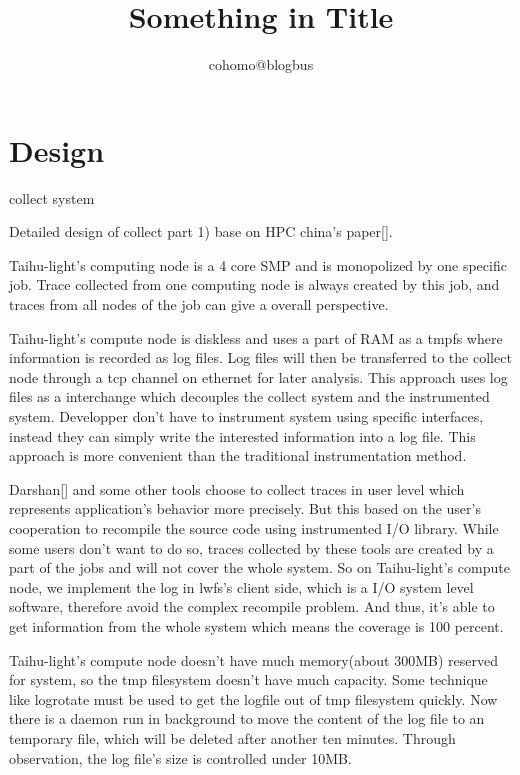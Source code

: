 \documentclass{article}
\begin{document}
\title{Something in Title}

\author{cohomo@blogbus}

\date{}

\maketitle

\fi

\section{Design}

\label{sec:design}

collect system

Detailed design of collect part 1)
base on HPC china's paper[].

Taihu-light's computing node is a 4 core SMP and is monopolized by one specific job. Trace collected from one computing node is always created by this job, and traces from all nodes of the job can give a overall perspective.

Taihu-light's compute node is diskless and uses a part of RAM as a tmpfs where information is recorded as log files. Log files will then be transferred to the collect node through a tcp channel on ethernet for later analysis. This approach uses log files as a interchange which decouples the collect system and the instrumented system. Developper don't have to instrument system using specific interfaces, instead they can simply write the interested information into a log file. This approach is more convenient than the traditional instrumentation method.

Darshan[] and some other tools choose to collect traces in user level which represents application's behavior more precisely. But this based on the user's cooperation to recompile the source code using instrumented I/O library. While some users don't want to do so, traces collected by these tools are created by a part of the jobs and will not cover the whole system. So on Taihu-light's compute node, we implement the log in lwfs's client side, which is a I/O system level software, therefore avoid the complex recompile problem. And thus, it's able to get information from the whole system which means the coverage is 100 percent. 

Taihu-light's compute node doesn't have much memory(about 300MB) reserved for system, so the tmp filesystem doesn't have much capacity. Some technique like logrotate must be used to get the logfile out of tmp filesystem quickly. Now there is a daemon run in background to move the content of the log file to an temporary file, which will be deleted after another ten minutes. Through observation, the log file's size is controlled under 10MB.
\end{document}
